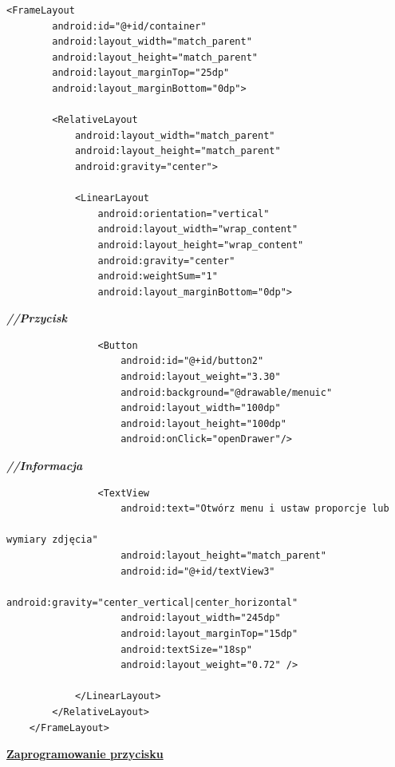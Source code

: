 \begin{verbatim}
<FrameLayout
        android:id="@+id/container"
        android:layout_width="match_parent"
        android:layout_height="match_parent"
        android:layout_marginTop="25dp"
        android:layout_marginBottom="0dp">

        <RelativeLayout
            android:layout_width="match_parent"
            android:layout_height="match_parent"
            android:gravity="center">

            <LinearLayout
                android:orientation="vertical"
                android:layout_width="wrap_content"
                android:layout_height="wrap_content"
                android:gravity="center"
                android:weightSum="1"
                android:layout_marginBottom="0dp">\end{verbatim}
                                                           \textit{\textbf{//Przycisk}}
                                                             \begin{verbatim}
                <Button
                    android:id="@+id/button2"
                    android:layout_weight="3.30"
                    android:background="@drawable/menuic"
                    android:layout_width="100dp"
                    android:layout_height="100dp"
                    android:onClick="openDrawer"/>\end{verbatim}
                                                               \textit{\textbf{//Informacja}}
                                                                 \begin{verbatim}
                <TextView
                    android:text="Otwórz menu i ustaw proporcje lub 
															                    wymiary zdjęcia"
                    android:layout_height="match_parent"
                    android:id="@+id/textView3"
                    android:gravity="center_vertical|center_horizontal"
                    android:layout_width="245dp"
                    android:layout_marginTop="15dp"
                    android:textSize="18sp"
                    android:layout_weight="0.72" />

            </LinearLayout>
        </RelativeLayout>
    </FrameLayout>
\end{verbatim}

\begin{center}
\underline{\textbf{Zaprogramowanie przycisku}}\\
\end{center}

